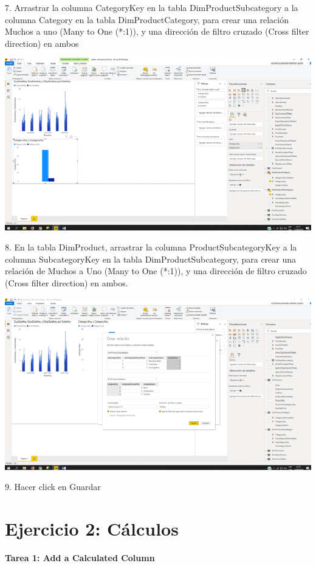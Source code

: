 \item 7. Arrastrar la columna CategoryKey en la tabla DimProductSubcategory a la columna Category en la tabla DimProductCategory, para crear una relación Muchos a uno (Many to One (*:1)), y una dirección de filtro cruzado (Cross filter direction) en ambos
\begin{center}
\includegraphics[width=15cm]{./Imagenes/img21} 
\end{center}

\item 8. En la tabla DimProduct, arrastrar la columna ProductSubcategoryKey a la columna SubcategoryKey en la tabla DimProductSubcategory, para crear una relación de Muchos a Uno (Many to One (*:1)), y una dirección de filtro cruzado (Cross filter direction) en ambos.
\begin{center}
\includegraphics[width=15cm]{./Imagenes/img22} 
\end{center}

\item 9. Hacer click en Guardar

\section*{Ejercicio 2: Cálculos}
\item \textbf{Tarea 1: Add a Calculated Column}

